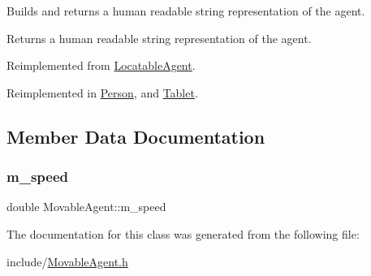 Builds and returns a human readable string representation of the agent. \begin{DoxyReturn}{Returns}
a human readable string representation of the agent. 
\end{DoxyReturn}


Reimplemented from \mbox{\hyperlink{class_locatable_agent_a88674f4c8ab9b1b2f3986b226bf4244f}{Locatable\+Agent}}.



Reimplemented in \mbox{\hyperlink{class_person_a68872538da519d0a04297f43376db27c}{Person}}, and \mbox{\hyperlink{class_tablet_a3fae01e7d526699476221c6a686a4fba}{Tablet}}.



\subsection{Member Data Documentation}
\mbox{\label{class_movable_agent_ac725b42e7b968740a59c3e1033d69ac5}} 
\subsubsection{\texorpdfstring{m\_speed}{m\_speed}}
{\footnotesize\ttfamily double Movable\+Agent\+::m\+\_\+speed\hspace{0.3cm}{\ttfamily [private]}}



The documentation for this class was generated from the following file\+:\begin{DoxyCompactItemize}
\item 
include/\mbox{\hyperlink{_movable_agent_8h}{Movable\+Agent.\+h}}\end{DoxyCompactItemize}
